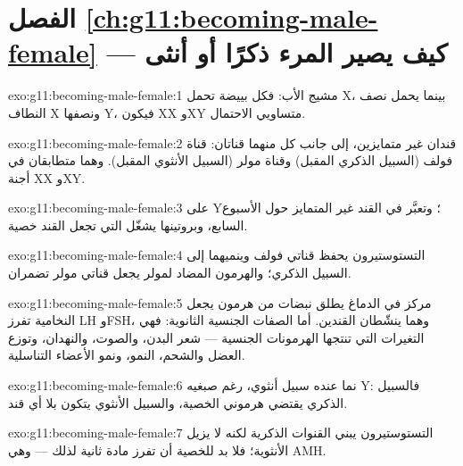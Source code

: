 \section*{الفصل \ref{ch:g11:becoming-male-female} --- كيف يصير المرء ذكرًا أو أنثى}

\begin{solution}{exo:g11:becoming-male-female:1}
مشيج الأب: فكل بييضة تحمل X، بينما يحمل نصف النطاف X ونصفها Y، فيكون
XX وXY متساويي الاحتمال.
\end{solution}

\begin{solution}{exo:g11:becoming-male-female:2}
قندان غير متمايزين، إلى جانب كل منهما قناتان: قناة فولف (السبيل الذكري
المقبل) وقناة مولر (السبيل الأنثوي المقبل). وهما متطابقان في أجنة XX
وXY.
\end{solution}

\begin{solution}{exo:g11:becoming-male-female:3}
على  Y؛ وتعبَّر في القند غير المتمايز حول الأسبوع السابع، وبروتينها
يشغّل  التي تجعل القند خصية.
\end{solution}

\begin{solution}{exo:g11:becoming-male-female:4}
التستوستيرون يحفظ قناتي فولف وينميهما إلى السبيل الذكري؛ والهرمون
المضاد لمولر يجعل قناتي مولر تضمران.
\end{solution}

\begin{solution}{exo:g11:becoming-male-female:5}
مركز في الدماغ يطلق نبضات من هرمون يجعل النخامية تفرز LH وFSH، وهما
ينشّطان القندين. أما الصفات الجنسية الثانوية: فهي التغيرات التي تنتجها
الهرمونات الجنسية --- شعر البدن، والصوت، والنهدان، وتوزع العضل والشحم،
 النمو، ونمو الأعضاء التناسلية.
\end{solution}

\begin{solution}{exo:g11:becoming-male-female:6}
نما عنده سبيل أنثوي، رغم صبغيه Y: فالسبيل الذكري يقتضي هرموني الخصية،
والسبيل الأنثوي يتكون بلا أي قند.
\end{solution}

\begin{solution}{exo:g11:becoming-male-female:7}
التستوستيرون يبني القنوات الذكرية لكنه لا يزيل الأنثوية؛ فلا بد للخصية
أن تفرز مادة ثانية لذلك --- وهي AMH.
\end{solution}

